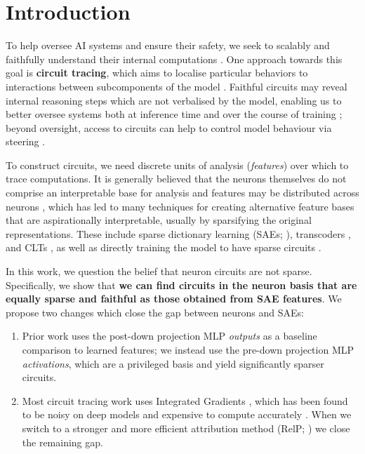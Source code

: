 \documentclass{article}
\theoremstyle{plain}
\theoremstyle{definition}
\theoremstyle{remark}
\begin{document}
\section{Introduction}


To help oversee AI systems and ensure their safety, we seek to scalably and faithfully understand their internal computations
\cite{ngo2022alignment,cotra2022without}. One approach towards this goal is \textbf{circuit tracing}, which aims to localise
particular behaviors to interactions between subcomponents of the model
\cite{olah2020zoom,elhage2021mathematical,wang2022interpretability,conmy2023towards,marks2025sparse,ameisen2025circuit}.
Faithful circuits may reveal internal reasoning steps which are not verbalised by the model, enabling us to better oversee systems
both at inference time and over the course of training \cite{sharkey2025open,casper2024blackbox}; beyond oversight, access to circuits can help to control model behaviour via steering \cite{li2023inference,marks2025sparse}.

To construct circuits, we need discrete units of analysis (\textit{features}) over which to trace computations. It is generally believed that the
neurons themselves do not comprise an interpretable base for analysis and features may be distributed across neurons \citep[e.g.][]{cunningham2023sparse}, which has led to many
techniques for creating alternative feature bases that are aspirationally interpretable, usually by sparsifying the original representations. These include sparse dictionary learning (SAEs; \citealp{marks2025sparse}),
transcoders \citep{dunefsky2024transcoders,ge2024automatically},
and CLTs \citep{ameisen2025circuit},
as well as directly training the model to have sparse circuits \citep{gao2025weight}.

In this work, we question the belief that neuron circuits are not sparse.
Specifically, we show that \textbf{we can find circuits in the neuron basis that are equally
sparse and faithful as those obtained from SAE features}. We propose two changes which close the gap between
neurons and SAEs:
\begin{enumerate}
 \item Prior work uses the post-down projection MLP \textit{outputs} as a baseline comparison to learned features; we
   instead use the pre-down projection MLP \textit{activations}, which are a privileged basis and yield significantly sparser circuits.
 \item Most circuit tracing work uses Integrated Gradients \cite{sundararajan2017axiomatic}, which has been found to be noisy on deep models and expensive to compute accurately \cite{makino2024impact}. When we switch to a stronger and more efficient attribution method (RelP; \citealp{jafari2025relp}) we close the remaining gap.
\end{enumerate}
\end{document}
